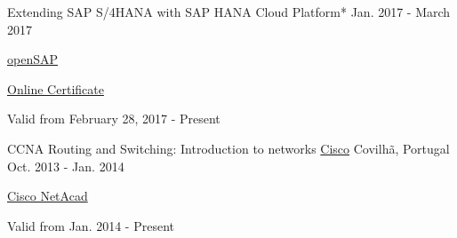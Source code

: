 \begin{cventries}
  \cventry
    {Extending SAP S/4HANA with SAP HANA Cloud Platform*} %
    {} %
    {} %
    {Jan. 2017 - March 2017} %
    {
	    \begin{cvitems} %
        \item {\href{https://open.sap.com/}{openSAP}} %
        \item {\href{https://open.sap.com/verify/xugal-vaseb-firih-zadyd-deniv}{Online Certificate}} %
        \item {Valid from February 28, 2017 - Present} %
      \end{cvitems}
    }
   
  \cventry
    {CCNA Routing and Switching: Introduction to networks} %
    {\href{https://www.cisco.com/}{Cisco}} %
    {Covilh\~a, Portugal} %
    {Oct. 2013 - Jan. 2014} %
    {
	    \begin{cvitems} %
        \item {\href{https://www.netacad.com/}{Cisco NetAcad}} %
        \item {Valid from Jan. 2014 - Present} %
      \end{cvitems}
    }

\end{cventries}